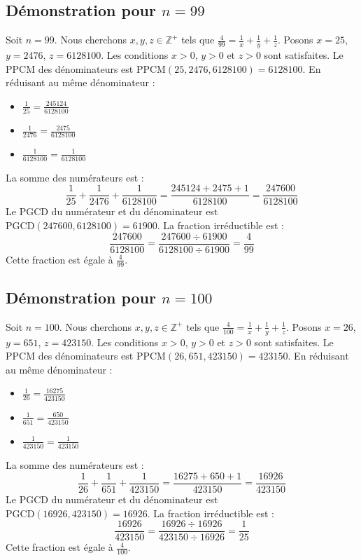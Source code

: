 \documentclass[11pt,a4paper]{article}
\begin{document}
\subsection{Démonstration pour $n = 99$}
Soit $n = 99$. Nous cherchons $x, y, z \in \mathbb{Z}^{+}$ tels que $\frac{4}{99} = \frac{1}{x} + \frac{1}{y} + \frac{1}{z}$.
Posons $x = 25$, $y = 2476$, $z = 6128100$.
Les conditions $x > 0$, $y > 0$ et $z > 0$ sont satisfaites.
Le PPCM des dénominateurs est $\text{PPCM}(25, 2476, 6128100) = 6128100$.
En réduisant au même dénominateur :
\begin{itemize}
    \item $\frac{1}{25} = \frac{245124}{6128100}$
    \item $\frac{1}{2476} = \frac{2475}{6128100}$
    \item $\frac{1}{6128100} = \frac{1}{6128100}$
\end{itemize}
La somme des numérateurs est :
$$ \frac{1}{25} + \frac{1}{2476} + \frac{1}{6128100} = \frac{245124 + 2475 + 1}{6128100} = \frac{247600}{6128100} $$
Le PGCD du numérateur et du dénominateur est $\text{PGCD}(247600, 6128100) = 61900$.
La fraction irréductible est :
$$ \frac{247600}{6128100} = \frac{247600 \div 61900}{6128100 \div 61900} = \frac{4}{99} $$
Cette fraction est égale à $\frac{4}{99}$.

\subsection{Démonstration pour $n = 100$}
Soit $n = 100$. Nous cherchons $x, y, z \in \mathbb{Z}^{+}$ tels que $\frac{4}{100} = \frac{1}{x} + \frac{1}{y} + \frac{1}{z}$.
Posons $x = 26$, $y = 651$, $z = 423150$.
Les conditions $x > 0$, $y > 0$ et $z > 0$ sont satisfaites.
Le PPCM des dénominateurs est $\text{PPCM}(26, 651, 423150) = 423150$.
En réduisant au même dénominateur :
\begin{itemize}
    \item $\frac{1}{26} = \frac{16275}{423150}$
    \item $\frac{1}{651} = \frac{650}{423150}$
    \item $\frac{1}{423150} = \frac{1}{423150}$
\end{itemize}
La somme des numérateurs est :
$$ \frac{1}{26} + \frac{1}{651} + \frac{1}{423150} = \frac{16275 + 650 + 1}{423150} = \frac{16926}{423150} $$
Le PGCD du numérateur et du dénominateur est $\text{PGCD}(16926, 423150) = 16926$.
La fraction irréductible est :
$$ \frac{16926}{423150} = \frac{16926 \div 16926}{423150 \div 16926} = \frac{1}{25} $$
Cette fraction est égale à $\frac{4}{100}$.
\end{document}
